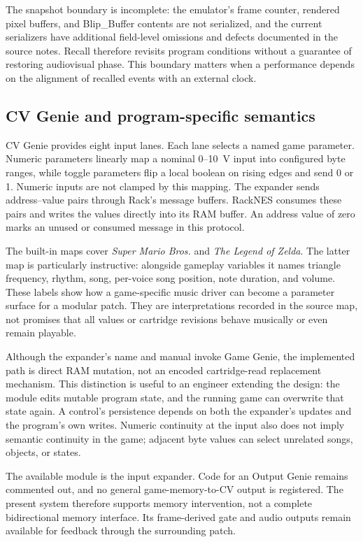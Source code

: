 \documentclass[10pt,letterpaper,twocolumn]{article}
\begin{document}
The snapshot boundary is incomplete: the emulator's frame counter, rendered
pixel buffers, and Blip\_Buffer contents are not serialized, and the current
serializers have additional field-level omissions and defects documented in
the source notes. Recall therefore revisits program conditions without a
guarantee of restoring audiovisual phase. This boundary matters when a
performance depends on the alignment of recalled events with an external clock.

\subsection{CV Genie and program-specific semantics}
CV Genie provides eight input lanes. Each lane selects a named game parameter.
Numeric parameters linearly map a nominal 0--10~V input into configured byte
ranges, while toggle parameters flip a local boolean on rising edges and send
0 or 1. Numeric inputs are not clamped by this mapping. The expander sends
address--value pairs through
Rack's message buffers. RackNES consumes these pairs and writes the values
directly into its RAM buffer. An address value of zero marks an unused or
consumed message in this protocol.

The built-in maps cover \emph{Super Mario Bros.} and \emph{The Legend of Zelda}.
The latter map is particularly instructive: alongside gameplay variables it
names triangle frequency, rhythm, song, per-voice song position, note duration,
and volume. These labels show how a game-specific music driver can become a
parameter surface for a modular patch. They are interpretations recorded in
the source map, not promises that all values or cartridge revisions behave
musically or even remain playable.

Although the expander's name and manual invoke Game Genie, the implemented
path is direct RAM mutation, not an encoded cartridge-read replacement
mechanism. This distinction is useful to an engineer extending the design:
the module edits mutable program state, and the running game can overwrite
that state again. A control's persistence depends on both the expander's
updates and the program's own writes. Numeric continuity at the input also
does not imply semantic continuity in the game; adjacent byte values can
select unrelated songs, objects, or states.

The available module is the input expander. Code for an Output Genie remains
commented out, and no general game-memory-to-CV output is registered. The
present system therefore supports memory intervention, not a complete
bidirectional memory interface. Its frame-derived gate and audio outputs
remain available for feedback through the surrounding patch.
\end{document}
